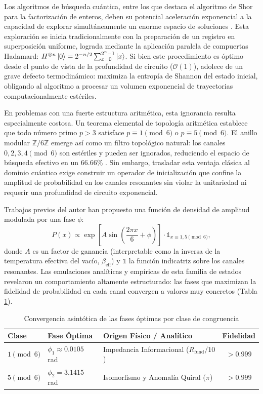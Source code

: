 \documentclass[12pt,a4paper]{article}
\theoremstyle{plain}
\theoremstyle{definition}
\theoremstyle{remark}
\begin{document}
Los algoritmos de búsqueda cuántica, entre los que destaca el algoritmo de Shor para la factorización de enteros, deben su potencial aceleración exponencial a la capacidad de explorar simultáneamente un enorme espacio de soluciones \cite{PeinadorGenesis}. Esta exploración se inicia tradicionalmente con la preparación de un registro en superposición uniforme, lograda mediante la aplicación paralela de compuertas Hadamard: $H^{\otimes n}\ket{0} = 2^{-n/2}\sum_{x=0}^{2^n-1}\ket{x}$. Si bien este procedimiento es óptimo desde el punto de vista de la profundidad de circuito ($\mathcal{O}(1)$), adolece de un grave defecto termodinámico: maximiza la entropía de Shannon del estado inicial, obligando al algoritmo a procesar un volumen exponencial de trayectorias computacionalmente estériles.

En problemas con una fuerte estructura aritmética, esta ignorancia resulta especialmente costosa. Un teorema elemental de topología aritmética establece que todo número primo $p>3$ satisface $p \equiv 1 \pmod 6$ o $p \equiv 5 \pmod 6$. El anillo modular $\mathbb{Z}/6\mathbb{Z}$ emerge así como un filtro topológico natural: los canales $0,2,3,4 \pmod 6$ son estériles y pueden ser ignorados, reduciendo el espacio de búsqueda efectivo en un $66.66\%$ \cite{PeinadorSpectrum}. Sin embargo, trasladar esta ventaja clásica al dominio cuántico exige construir un operador de inicialización que confine la amplitud de probabilidad en los canales resonantes sin violar la unitariedad ni requerir una profundidad de circuito exponencial.

Trabajos previos del autor \cite{PeinadorDSP} han propuesto una función de densidad de amplitud modulada por una fase $\phi$:
\begin{equation}
P(x) \propto \exp\left[A \sin\left(\frac{2\pi x}{6} + \phi\right)\right] \cdot \mathds{1}_{x\equiv 1,5 \pmod{6}},
\label{eq:amplitud}
\end{equation}
donde $A$ es un factor de ganancia (interpretable como la inversa de la temperatura efectiva del vacío, $\beta_{\text{eff}}$) y $\mathds{1}$ la función indicatriz sobre los canales resonantes. Las emulaciones analíticas y empíricas de esta familia de estados revelaron un comportamiento altamente estructurado: las fases que maximizan la fidelidad de probabilidad en cada canal convergen a valores muy concretos (Tabla \ref{tab:fases}).

\begin{table}[H]
\centering
\caption{Convergencia asintótica de las fases óptimas por clase de congruencia}
\label{tab:fases}
\begin{tabular}{lllc}
\toprule
\textbf{Clase} & \textbf{Fase Óptima} & \textbf{Origen Físico / Analítico} & \textbf{Fidelidad} \\
\midrule
$1 \pmod 6$ & $\phi_1 \approx 0.0105$ rad & Impedancia Informacional ($R_{\text{fund}}/10$) & $> 0.999$ \\
$5 \pmod 6$ & $\phi_2 = 3.1415$ rad & Isomorfismo y Anomalía Quiral ($\pi$) & $> 0.999$ \\
\bottomrule
\end{tabular}
\end{table}
\end{document}
